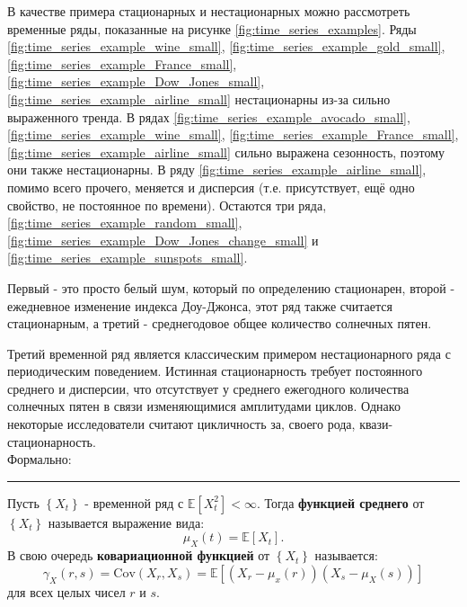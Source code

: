 \newpage 
В качестве примера стационарных и нестационарных можно рассмотреть временные ряды, показанные на
рисунке 
\ref{fig:time_series_examples}. Ряды 
\ref{fig:time_series_example_wine_small}, 
\ref{fig:time_series_example_gold_small}, 
\ref{fig:time_series_example_France_small}, 
\ref{fig:time_series_example_Dow_Jones_small}, 
\ref{fig:time_series_example_airline_small} 
нестационарны из-за сильно выраженного тренда. В рядах 
\ref{fig:time_series_example_avocado_small}, 
\ref{fig:time_series_example_wine_small}, 
\ref{fig:time_series_example_France_small}, 
\ref{fig:time_series_example_airline_small} 
сильно выражена сезонность, поэтому они также нестационарны. В ряду 
\ref{fig:time_series_example_airline_small}, 
помимо всего прочего, меняется и дисперсия (т.е. присутствует, ещё одно свойство, не постоянное по времени). 
Остаются три ряда, 
\ref{fig:time_series_example_random_small}, 
\ref{fig:time_series_example_Dow_Jones_change_small} и 
\ref{fig:time_series_example_sunspots_small}.

Первый - это просто белый шум, который по определению стационарен, второй - ежедневное изменение индекса Доу-Джонса, 
этот ряд также считается стационарным, а третий - среднегодовое общее количество солнечных пятен. 

Третий временной ряд является классическим примером нестационарного ряда с периодическим поведением. 
Истинная стационарность требует постоянного среднего и дисперсии, что отсутствует у среднего 
ежегодного количества солнечных пятен в связи изменяющимися амплитудами циклов. Однако некоторые 
исследователи считают цикличность за, своего рода, \guillemotleft квази-стационарность\guillemotright \cite{Forecasting_Brockwell}.\\

Формально:

\noindent\rule{\linewidth}{0.1mm}

\begin{definition}
    Пусть $\left\{ X_t \right\}$ - временной ряд с 
    $\mathbb{E}\left[ X_t^2 \right] < \infty$. Тогда \textbf{функцией среднего} 
    от $\left\{ X_t \right\}$ называется выражение вида:
    \vspace{-10pt}
    \begin{equation*}
        \mu_X(t) = \mathbb{E} \left[ X_t \right].
    \end{equation*}
    \vspace{-20pt}
    В свою очередь \textbf{ковариационной функцией} от $\left\{ X_t \right\}$ называется:
    \begin{equation*}
        \gamma_X (r, s) = \text{Cov}(X_r, X_s) = \mathbb{E}\left[ (X_r - \mu_x (r)) 
        (X_s - \mu_X (s)) \right]
    \end{equation*}
    \vspace{-20pt}
    для всех целых чисел $r$ и $s$.\\
\end{definition}

